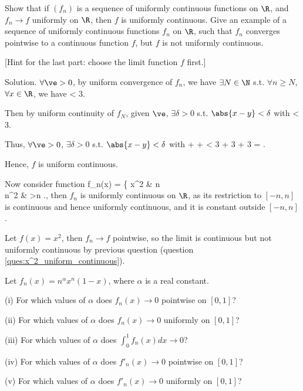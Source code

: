 \een

\begin{exercise}
Show that if $(f_n)$ is a sequence of uniformly continuous functions on $\R$, and $f_n \to f$ uniformly on $\R$, then $f$ is uniformly continuous. Give an example of a sequence of uniformly continuous functions $f_n$ on $\R$, such that $f_n$ converges pointwise to a continuous function $f$, but $f$ is not uniformly continuous.

[Hint for the last part: choose the limit function $f$ first.]
\end{exercise}

Solution. $\forall \ve >0$, by uniform convergence of $f_n$, we have $\exists N \in \N$ s.t. $\forall n\geq N$, $\forall x \in\R$, we have
\be
{} < \frac{\ve}3.
\ee

Then by uniform continuity of $f_N$, given $\ve$, $\exists \delta >0$ s.t. $\abs{x-y}<\delta $ with
\be
{} < \frac{\ve}3.
\ee

Thus, $\forall \ve>0$, $\exists \delta >0$ s.t. $\abs{x-y}<\delta$ with
\be
{} \leq {} +  +  < \frac{\ve}3 + \frac{\ve}3 + \frac{\ve}3 = \ve.
\ee

Hence, $f$ is uniform continuous.

Now consider function
\be
f_n(x) = \left\{
x^2 \quad\quad &  \leq n\\
n^2 &  >n
\ea\right.,
\ee
then $f_n$ is uniformly continuous on $\R$, as its restriction to $[-n,n]$ is continuous and hence uniformly continuous, and it is constant outside $[-n,n]$. 

Let $f(x)=x^2$, then $f_n \to f$ pointwise, so the limit is continuous but not uniformly continuous by previous question (question \ref{ques:x^2_uniform_continuous}).

\begin{exercise}
Let $f_n(x) = n^\alpha x^n(1 - x)$, where $\alpha$ is a real constant.
\ben
\item [(i)] For which values of $\alpha$ does $f_n(x) \to 0$ pointwise on $[0, 1]$?
\item [(ii)] For which values of $\alpha$ does $f_n(x) \to 0$ uniformly on $[0, 1]$?
\item [(iii)] For which values of $\alpha$ does $\int^1_0 f_n(x)dx \to 0$?
\item [(iv)] For which values of $\alpha$ does $f'_n(x) \to 0$ pointwise on $[0, 1]$?
\item [(v)] For which values of $\alpha$ does $f'_n(x) \to 0$ uniformly on $[0, 1]$?
\een
\end{exercise}

